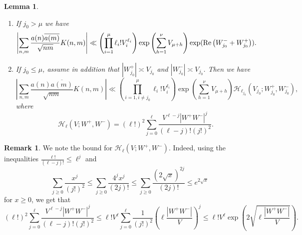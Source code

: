 \documentclass[oneside, 12pt]{amsart}
\newtheorem{lem}[thm]{Lemma}
\theoremstyle{definition}
\newtheorem*{rem}{Remark}
\begin{document}
\begin{lem}
		\begin{enumerate}
			\item If $j_0>\mu$ we have $$\left|\sum_{n,m} \frac{a(n)\overline{a(m)}}{\sqrt{nm}}K(n,m)\right| \ll \left(\prod_{i=1}^{\mu} \ell_i! V_i^{\ell_i}\right)\exp \left(\sum_{h=1}^{\nu} V_{\mu+h}\right)\exp(\textup{Re}\left(W_{j_0}^- + W_{j_0}^+\right)).$$
			\item If $j_0 \leq \mu$, assume in addition that $|W^+_{j_0}|\asymp V_{j_0}$ and $|W^{-}_{j_0}|\asymp V_{j_0}$. Then we have $$\left|\sum_{n,m} \frac{a(n)\overline{a(m)}}{\sqrt{nm}}K(n,m)\right| \ll \left(\prod_{i=1, i \neq j_0}^{\mu} \ell_i! V_i^{\ell_i}\right)\exp \left(\sum_{h=1}^{\nu} V_{\mu+h}\right) \mathcal{H}_{\ell_{j_0}}(V_{j_0}; W_{j_0}^+, W_{j_0}^-),$$ where $$\mathcal{H}_{\ell}(V;W^+,W^-)=(\ell!)^2\sum_{j=0}^{\ell} \frac{V^{\ell-j}|W^+W^-|^j}{(\ell-j)!(j!)^2}.$$
		\end{enumerate}
	\end{lem}
	
	\begin{rem}
		We note the bound for $\mathcal{H}_{\ell}(V;W^+,W^-)$. Indeed, using the inequalities $\frac{\ell!}{(\ell-j)!}\leq \ell^j$ and  $$\sum_{j\geq 0} \frac{x^j}{(j!)^2}\leq \sum_{j\geq 0} \frac{4^jx^j}{(2j)!} \leq \sum_{j \geq 0} \frac{(2\sqrt{x})^{2j}}{(2j)!}\leq e^{2\sqrt{x}}$$ for $x\geq 0$, we get that $$(\ell!)^2\sum_{j=0}^{\ell} \frac{V^{\ell-j}|W^+W^-|^j}{(\ell-j)!(j!)^2}\leq \ell! V^{\ell} \sum_{j=0}^{\ell} \frac{1}{(j!)^2}\left(\ell\frac{|W^+W^-|}{V}\right)^j \leq \ell! V^{\ell}\exp\left(2 \sqrt{\ell\frac{|W^+W^-|}{V}}\right).$$
	\end{rem}
	
\end{document}
